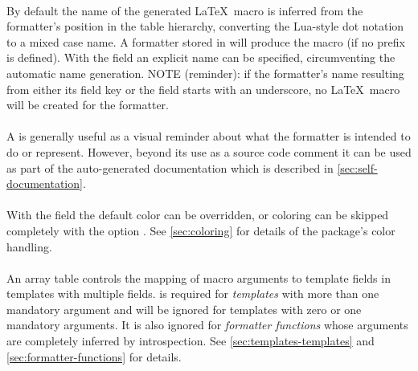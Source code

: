 \documentclass{scrartcl}
\begin{document}
\paragraph{}

By default the name of the generated \LaTeX\ macro is inferred from the
formatter's position in the table hierarchy, converting the Lua-style dot
notation to a mixed case name.  A formatter stored in 
will produce the macro  (if no prefix is defined).  With the
 field an explicit name can be specified, circumventing the
automatic name generation.  NOTE (reminder): if the formatter's name resulting
from either its field key or the  field starts with an underscore,
no \LaTeX\ macro will be created for the formatter.


\paragraph{}

A  is generally useful as a visual reminder about what the
formatter is intended to do or represent.  However, beyond its use as a source
code comment it can be used as part of the auto-generated documentation which is
described in \vref{sec:self-documentation}.


\paragraph{}

With the  field the default color can be overridden, or coloring
can be skipped completely with the option .  See
\vref{sec:coloring} for details of the package's color handling.


\paragraph{}

An array table  controls the mapping of macro arguments to template
fields in templates with multiple fields.   is required for
\emph{templates} with more than one mandatory argument and will be ignored for
templates with zero or one mandatory arguments.  It is also ignored for
\emph{formatter functions} whose arguments are completely inferred by
introspection.  See \vref{sec:templates-templates} and
\vref{sec:formatter-functions} for details.
\end{document}
